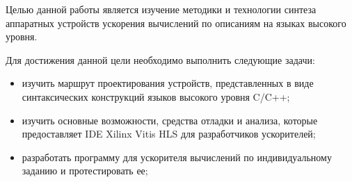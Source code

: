 
	Целью данной работы является изучение методики и технологии синтеза аппаратных устройств ускорения вычислений по описаниям на языках высокого уровня.

Для достижения данной цели необходимо выполнить следующие задачи:
\begin{itemize}
	\item изучить маршрут проектирования устройств, представленных в виде синтаксических конструкций языков высокого уровня C/C++;
	\item изучить основные возможности, средства отладки и анализа, которые предоставляет IDE Xilinx Vitis HLS для разработчиков ускорителей;
	\item разработать программу для ускорителя вычислений по индивидуальному заданию и протестировать ее;
\end{itemize}
